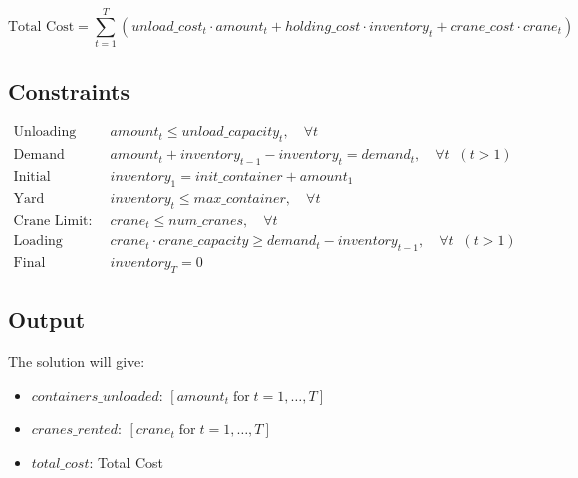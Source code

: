 \documentclass{article}
\begin{document}
\[
\text{Total Cost} = \sum_{t=1}^{T} (unload\_cost_{t} \cdot amount_{t} + holding\_cost \cdot inventory_{t} + crane\_cost \cdot crane_{t})
\]

\subsection*{Constraints}

\begin{align}
    \text{Unloading Capacity Constraint:} \quad & amount_{t} \leq unload\_capacity_{t}, \quad \forall t \\
    \text{Demand Fulfillment:} \quad & amount_{t} + inventory_{t-1} - inventory_{t} = demand_{t}, \quad \forall t \;\; (t > 1) \\
    \text{Initial Inventory:} \quad & inventory_{1} = init\_container + amount_{1} \\
    \text{Yard Capacity:} \quad & inventory_{t} \leq max\_container, \quad \forall t \\
    \text{Crane Limit:} \quad & crane_{t} \leq num\_cranes, \quad \forall t \\
    \text{Loading Capacity Constraint:} \quad & crane_{t} \cdot crane\_capacity \geq demand_{t} - inventory_{t-1}, \quad \forall t \;\; (t > 1) \\
    \text{Final Inventory Constraint:} \quad & inventory_{T} = 0 
\end{align}

\subsection*{Output}
The solution will give:
\begin{itemize}
    \item $containers\_unloaded$: $[amount_{t} \; \text{for} \; t = 1, \ldots, T]$
    \item $cranes\_rented$: $[crane_{t} \; \text{for} \; t = 1, \ldots, T]$
    \item $total\_cost$: Total Cost
\end{itemize}
\end{document}

